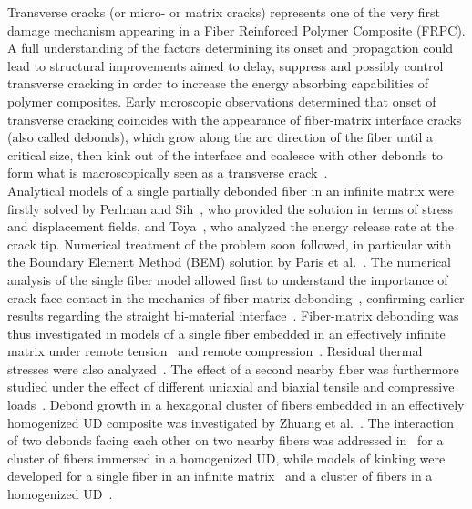 \documentclass[review]{elsarticle}
\begin{document}
Transverse cracks (or micro- or matrix cracks) represents one of the very first damage mechanism appearing in a Fiber Reinforced Polymer Composite (FRPC). A full understanding of the factors determining its onset and propagation could lead to structural improvements aimed to delay, suppress and possibly control transverse cracking in order to increase the energy absorbing capabilities of polymer composites. Early mcroscopic observations determined that onset of transverse cracking coincides with the appearance of fiber-matrix interface cracks (also called debonds), which grow along the arc direction of the fiber until a critical size, then kink out of the interface and coalesce with other debonds to form what is macroscopically seen as a transverse crack~\cite{Bailey1981}.\\
Analytical models of a single partially debonded fiber in an infinite matrix were firstly solved by Perlman and Sih~\cite{Perlman1967}, who provided the solution in terms of stress and displacement fields, and Toya~\cite{Toya1974}, who analyzed the energy release rate at the crack tip. Numerical treatment of the problem soon followed, in particular with the Boundary Element Method (BEM) solution by Paris et al.~\cite{Paris1996}. The numerical analysis of the single fiber model allowed first to understand the importance of crack face contact in the mechanics of fiber-matrix debonding~\cite{Varna1997a}, confirming earlier results regarding the straight bi-material interface~\cite{Comninou1977}. Fiber-matrix debonding was thus investigated in models of a single fiber embedded in an effectively infinite matrix under remote tension~\cite{Paris1996} and remote compression~\cite{Correa2007}. Residual thermal stresses were also analyzed~\cite{Correa2011}. The effect of a second nearby fiber was furthermore studied under the effect of different uniaxial and biaxial tensile and compressive loads~\cite{Correa2013,Correa2014,Sandino2016,Sandino2018}. Debond growth in a hexagonal cluster of fibers embedded in an effectively homogenized UD composite was investigated by Zhuang et al.~\cite{Zhuang2018}. The interaction of two debonds facing each other on two nearby fibers was addressed in~\cite{Varna2017} for a cluster of fibers immersed in a homogenized UD, while models of kinking were developed for a single fiber in an infinite matrix~\cite{Paris2007} and a cluster of fibers in a homogenized UD~\cite{Zhuang2018a}.\\
\end{document}

